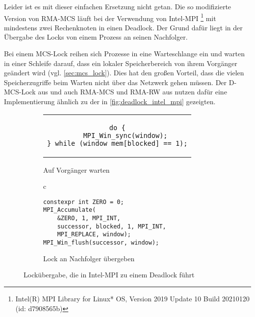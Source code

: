 Leider ist es mit dieser einfachen Ersetzung nicht getan.
Die so modifizierte Version von RMA-MCS läuft bei der Verwendung von Intel-MPI%
\footnote{Intel(R) MPI Library for Linux* OS, Version 2019 Update 10 Build 20210120 (id: d7908565b)}
mit mindestens zwei Rechenknoten in einen Deadlock.
Der Grund dafür liegt in der Übergabe des Locks von einem Prozess an seinen Nachfolger.

Bei einem MCS-Lock reihen sich Prozesse in eine Warteschlange ein
und warten in einer Schleife darauf,
dass ein lokaler Speicherbereich von ihrem Vorgänger geändert wird (vgl. \autoref{sec:mcs_lock}).
Dies hat den großen Vorteil,
dass die vielen Speicherzugriffe beim Warten nicht über das Netzwerk gehen müssen.
Der D-MCS-Lock aus \cite{AdvancedMpi} und auch RMA-MCS und RMA-RW aus \cite{RMA-RW}
nutzen dafür eine Implementierung
ähnlich zu der in \autoref{fig:deadlock_intel_mpi} gezeigten.

\begin{figure}[h]
    \begin{subfigure}[b]{.5\textwidth}
        \centering
        \begin{tabular}{c}\begin{lstlisting}
do {
    MPI_Win_sync(window);
} while (window_mem[blocked] == 1);
        \end{lstlisting}\end{tabular}
        \caption{Auf Vorgänger warten}
        \label{fig:wait_win_sync}
    \end{subfigure}
    \begin{subfigure}[b]{.5\textwidth}
        \centering
        \begin{tabular}{c}\begin{lstlisting}
constexpr int ZERO = 0;
MPI_Accumulate(
    &ZERO, 1, MPI_INT,
    successor, blocked, 1, MPI_INT,
    MPI_REPLACE, window);
MPI_Win_flush(successor, window);
        \end{lstlisting}\end{tabular}
        \caption{Lock an Nachfolger übergeben}
        \label{fig:notify_accumulate}
    \end{subfigure}
    \caption{Lockübergabe, die in Intel-MPI zu einem Deadlock führt}
    \label{fig:deadlock_intel_mpi}
\end{figure}

